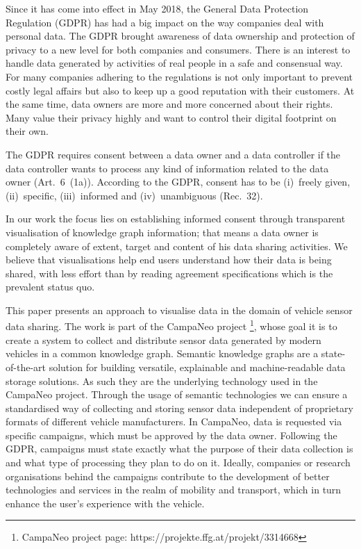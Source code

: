 \documentclass[../paper.tex]{subfiles}
\begin{document}
  Since it has come into effect in May 2018, the General Data Protection
  Regulation (GDPR) \cite{GDPR} has had a big impact on the way companies deal with
  personal data. The GDPR brought awareness of data ownership and protection
  of privacy to a new level for both companies and consumers. There is an
  interest to handle data generated by activities of real people in a safe and
  consensual way. For many companies adhering to the regulations is not only
  important to prevent costly legal affairs but also to keep up a good
  reputation with their customers. At the same time, data owners are more and
  more concerned about their rights. Many value their privacy highly and want
  to control their digital footprint on their own.

  The GDPR requires consent between a data owner and a data controller
  if the data controller wants to process any kind of information related to
  the data owner (Art.~6~(1a)). According to the GDPR, consent has to be
  (i)~freely given, (ii)~specific, (iii)~informed and (iv)~unambiguous (Rec.~32).

  In our work the focus lies on establishing informed consent through transparent visualisation of 
  knowledge graph information; that means a data owner
  is completely aware of extent, target and content of his data sharing
  activities. We believe that
  visualisations help end users understand how their data is being shared,
  with less effort than by reading agreement specifications which is the prevalent
  status quo.


  This paper presents an approach to visualise data in the domain of vehicle
  sensor data sharing. The work is part of the CampaNeo project 
  \footnote{CampaNeo project page: https://projekte.ffg.at/projekt/3314668}, whose goal
  it is to create a system to collect and distribute sensor data generated by
  modern vehicles in a common knowledge graph.
  Semantic knowledge graphs are a state-of-the-art solution for building
  versatile, explainable and machine-readable data storage solutions.
  As such they are the underlying technology used in the CampaNeo project.
  Through the usage of semantic technologies we can ensure a standardised way of collecting 
  and storing sensor data independent of proprietary formats of different vehicle manufacturers.
  In CampaNeo, data is requested via specific campaigns, which must be
  approved by the data owner. Following the GDPR, campaigns must state exactly
  what the purpose of their data collection is and what type of processing they
  plan to do on it. Ideally, companies or research organisations behind the
  campaigns contribute to the development of better technologies and services
  in the realm of mobility and transport, which in turn enhance the user’s
  experience with the vehicle.
\end{document}
